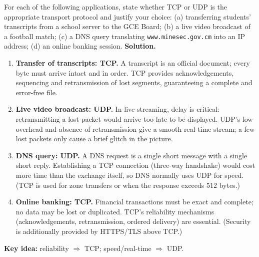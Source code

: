 \documentclass[11pt]{article}
\begin{document}
\begin{exoresolu}
For each of the following applications, state whether TCP or UDP is the appropriate transport protocol and justify your choice: (a) transferring students' transcripts from a school server to the GCE Board; (b) a live video broadcast of a football match; (c) a DNS query translating \texttt{www.minesec.gov.cm} into an IP address; (d) an online banking session.
\tcblower
\textbf{Solution.}
\begin{enumerate}
\item \textbf{Transfer of transcripts: TCP.} A transcript is an official document; every byte must arrive intact and in order. TCP provides acknowledgements, sequencing and retransmission of lost segments, guaranteeing a complete and error-free file.
\item \textbf{Live video broadcast: UDP.} In live streaming, delay is critical: retransmitting a lost packet would arrive too late to be displayed. UDP's low overhead and absence of retransmission give a smooth real-time stream; a few lost packets only cause a brief glitch in the picture.
\item \textbf{DNS query: UDP.} A DNS request is a single short message with a single short reply. Establishing a TCP connection (three-way handshake) would cost more time than the exchange itself, so DNS normally uses UDP for speed. (TCP is used for zone transfers or when the response exceeds 512 bytes.)
\item \textbf{Online banking: TCP.} Financial transactions must be exact and complete; no data may be lost or duplicated. TCP's reliability mechanisms (acknowledgements, retransmission, ordered delivery) are essential. (Security is additionally provided by HTTPS/TLS above TCP.)
\end{enumerate}
\textbf{Key idea:} reliability $\Rightarrow$ TCP; speed/real-time $\Rightarrow$ UDP.
\end{exoresolu}
\end{document}
